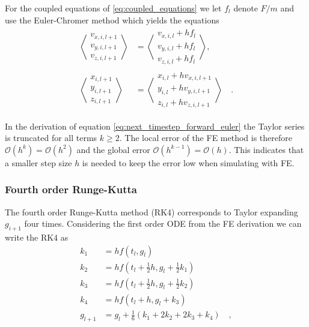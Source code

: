 \documentclass[../main_proj3.tex]{subfiles}
\begin{document}
For the coupled equations of \eqref{eq:coupled_equations} we let $f_l$ denote $F/m$ and use the Euler-Chromer method which yields the equations
\begin{equation}
\label{eq:coupled_equations_FE}
\begin{split}
    \left\langle\begin{matrix}
        v_{x,i,l+1} \\ v_{y,i,l+1}\\ v_{z,i,l+1}
    \end{matrix}\right\rangle &=
    \left\langle\begin{matrix}
        v_{x,i,l}+ hf_l\\ v_{y,i,l}+ hf_l\\ v_{z,i,l} + hf_l
    \end{matrix}\right\rangle, \\
    \left\langle\begin{matrix}
        x_{i,l+1} \\ y_{i,l+1}\\ z_{i,l+1}
    \end{matrix}\right\rangle &=
    \left\langle\begin{matrix}
        x_{i,l}+h v_{x,i,l+1}\\ y_{i,l} + h v_{y,i,l+1}\\ z_{i,l} + h v_{z,i,l+1}
    \end{matrix}\right\rangle \quad .
\end{split}    
\end{equation}

In the derivation of equation \eqref{eq:next_timestep_forward_euler} the Taylor series is truncated for all terms $k\geq 2$. The local error of the FE method is therefore $\mathcal{O}(h^{k}) = \mathcal{O}(h^{2})$ and the global error $\mathcal{O}(h^{k-1})=\mathcal{O}(h)$. This indicates that a smaller step size $h$ is needed to keep the error low when simulating with FE.

\subsubsection{Fourth order Runge-Kutta}

The fourth order Runge-Kutta method (RK4) corresponds to Taylor expanding $g_{i+1}$ four times. Considering the first order ODE from the FE derivation we can write the RK4 as
\begin{equation}
    \label{eq:next_timestep_RK4}
    \begin{split}
        k_1 &= hf(t_l, g_l) \\
        k_2 &= hf(t_l + \frac{1}{2}h, g_l +\frac{1}{2}k_1) \\
        k_3 &= hf(t_l + \frac{1}{2}h, g_l +\frac{1}{2}k_2) \\
        k_4 &= hf(t_l + h, g_l + k_3) \\
        g_{l+1} &= g_l + \frac{1}{6}(k_1 + 2k_2 + 2k_3 + k_4) \quad ,
    \end{split}
\end{equation}
\end{document}
